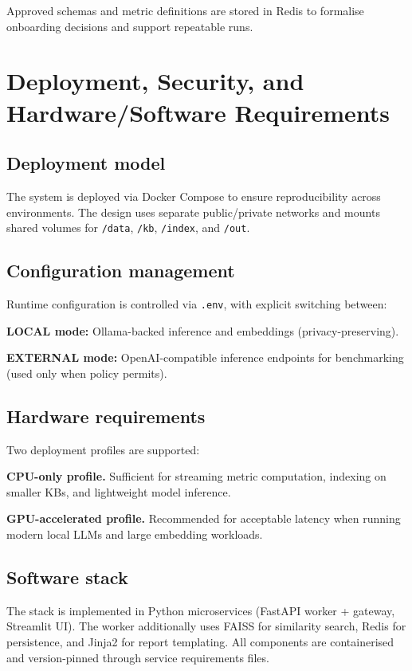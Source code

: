 \documentclass[]{UCD_CS_FYP_Report}
\begin{document}
Approved schemas and metric definitions are stored in Redis to formalise onboarding decisions and support repeatable runs.

\section{Deployment, Security, and Hardware/Software Requirements}
\label{sec:deployment}

\subsection{Deployment model}
The system is deployed via Docker Compose to ensure reproducibility across environments. The design uses separate public/private networks and mounts shared volumes for \texttt{/data}, \texttt{/kb}, \texttt{/index}, and \texttt{/out}.

\subsection{Configuration management}
Runtime configuration is controlled via \texttt{.env}, with explicit switching between:

\textbf{LOCAL mode:} Ollama-backed inference and embeddings (privacy-preserving).

\textbf{EXTERNAL mode:} OpenAI-compatible inference endpoints for benchmarking (used only when policy permits).

\subsection{Hardware requirements}
Two deployment profiles are supported:

\textbf{CPU-only profile.} Sufficient for streaming metric computation, indexing on smaller KBs, and lightweight model inference.

\textbf{GPU-accelerated profile.} Recommended for acceptable latency when running modern local LLMs and large embedding workloads.

\subsection{Software stack}
The stack is implemented in Python microservices (FastAPI worker + gateway, Streamlit UI). The worker additionally uses FAISS for similarity search, Redis for persistence, and Jinja2 for report templating. All components are containerised and version-pinned through service requirements files.
\end{document}
